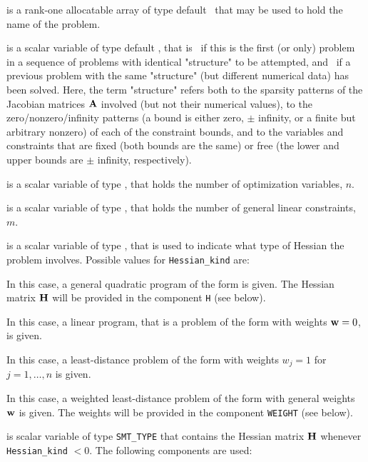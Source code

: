 \documentclass{galahad}
\begin{document}
\begin{description}

 is a rank-one allocatable array of type default \character\, that
may be used to hold the name of the problem.

 is a scalar variable of type default \logical,
 that is \true\ if this is the first (or only) problem in a sequence of
 problems with identical "structure" to be attempted, and \false\ if
 a previous problem with the same "structure" (but different
 numerical data) has been solved. Here, the term "structure" refers both to
 the sparsity patterns of the Jacobian matrices ${\mathbf{A}}$ involved
 (but not their numerical values), to the zero/nonzero/infinity patterns
 (a bound is either zero, $\pm$ infinity, or a finite but arbitrary
 nonzero) of each of the constraint bounds, and to the variables and constraints
 that are fixed (both bounds are the same) or free (the lower and upper
 bounds are $\pm$ infinity, respectively).

 is a scalar variable of type \integer,
 that holds the number of optimization variables, $n$.

 is a scalar variable of type \integer,
 that holds the number of general linear constraints, $m$.

 is a scalar variable of type \integer,
that is used to indicate what type of Hessian the problem involves.
Possible values for {\tt Hessian\_kind} are:

\begin{description}
  In this case, a general quadratic program of the form
 is given. The Hessian matrix ${\mathbf{H}}$ will be provided in the
component {\tt H} (see below).

  In this case, a linear program, that is a problem of the form
 with weights ${\mathbf{w}} = 0$, is given.

 In this case, a least-distance problem of the form 
with weights $w_{j} = 1$ for $j = 1, \ldots , n$ is given.

 In this case, a weighted least-distance problem of the form 
with general weights ${\mathbf{w}}$ is given. The weights will be
provided in the component {\tt WEIGHT} (see below).
\end{description}

 is scalar variable of type {\tt SMT\_TYPE}
that contains the Hessian matrix ${\mathbf{H}}$ whenever {\tt Hessian\_kind} $<0$.
The following components are used:


\end{description}
\end{document}
